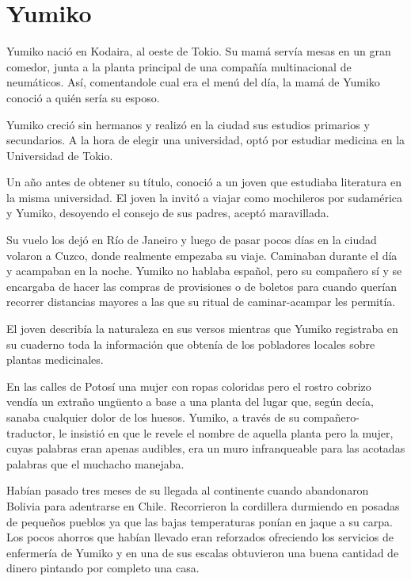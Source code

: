 \documentclass[12pt,twoside,openright]{book}
\begin{document}
\chapter*{Yumiko} 



Yumiko nació en Kodaira, al oeste de Tokio. Su mamá servía mesas en un gran comedor, junta a la planta principal de una compañía multinacional de neumáticos. Así, comentandole cual era el menú del día, la mamá de Yumiko conoció a quién sería su esposo.

Yumiko creció sin hermanos y realizó en la ciudad sus estudios primarios y secundarios. A la hora de elegir una universidad, optó por estudiar medicina en la Universidad de Tokio.

Un año antes de obtener su título, conoció a un joven que estudiaba literatura en la misma universidad. El joven la invitó a viajar como mochileros por sudamérica y Yumiko, desoyendo el consejo de sus padres, aceptó maravillada.

Su vuelo los dejó en Río de Janeiro y luego de pasar pocos días en la ciudad volaron a Cuzco, donde realmente empezaba su viaje. Caminaban durante el día y acampaban en la noche. Yumiko no hablaba español, pero su compañero sí y se encargaba de hacer las compras de provisiones o de boletos para cuando querían recorrer distancias mayores a las que su ritual de caminar-acampar les permitía.

El joven describía la naturaleza en sus versos mientras que Yumiko registraba en su cuaderno toda la información que obtenía de los pobladores locales sobre plantas medicinales.

En las calles de Potosí una mujer con ropas coloridas pero el rostro cobrizo vendía un extraño ungüento a base a una planta del lugar que, según decía, sanaba cualquier dolor de los huesos. Yumiko, a través de su compañero-traductor, le insistió en que le revele el nombre de aquella planta pero la mujer, cuyas palabras eran apenas audibles, era un muro infranqueable para las acotadas palabras que el muchacho manejaba.

Habían pasado tres meses de su llegada al continente cuando abandonaron Bolivia para adentrarse en Chile. Recorrieron la cordillera durmiendo en posadas de pequeños pueblos ya que las bajas temperaturas ponían en jaque a su carpa. Los pocos ahorros que habían llevado eran reforzados ofreciendo los servicios de enfermería de Yumiko y en una de sus escalas obtuvieron una buena cantidad de dinero pintando por completo una casa.
\end{document}
